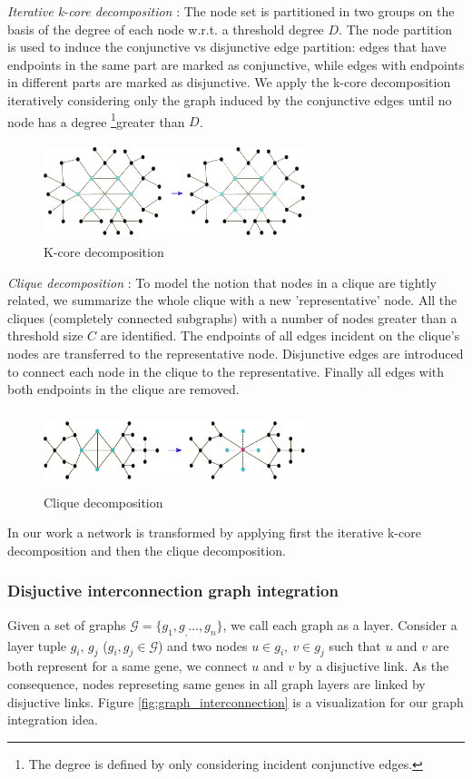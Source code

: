 \textit{Iterative k-core decomposition} \cite{kcore}: The node set is partitioned in two groups on the basis of the degree of each node w.r.t. a threshold degree $D$. The node partition is used to induce the conjunctive vs disjunctive edge partition: edges that have endpoints in the same part are marked as conjunctive, while edges with endpoints in different parts are marked as disjunctive. We apply the k-core decomposition iteratively considering only the graph induced by the conjunctive edges until no node has a degree \footnote{The degree is defined by only considering incident conjunctive edges.}greater than $D$.

\begin{figure}
\includegraphics[height=1.1in, width=3in]{k_core.pdf}
\caption{K-core decomposition}
\label{fig:01}
\end{figure}

\textit{Clique decomposition} \cite{clique}: To model the notion that nodes in a clique are tightly related, we summarize the whole clique with a new 'representative' node. All the cliques (completely connected subgraphs) with a number of nodes greater than a threshold size $C$ are identified. The endpoints of all edges incident on the clique's nodes are transferred to the representative node. Disjunctive edges are introduced to connect each node in the clique to the representative. Finally all edges with both endpoints in the clique are removed.
\begin{figure}
\includegraphics[height=0.9in, width=3in]{cliques.pdf}
\caption{Clique decomposition}
\label{fig:02}
\end{figure}

In our work a network is transformed by applying first the iterative k-core decomposition and then the clique decomposition.

\subsubsection*{Disjuctive interconnection graph integration} 
Given a set of graphs $\mathcal{G} = \lbrace g_1, g_,\ldots, g_n \rbrace$, we call each graph as a layer. Consider a layer tuple $g_i$, $g_j$ ($g_i, g_j \in \mathcal{G}$) and two nodes $u\in g_i,\ v \in g_j$ such that $u$ and $v$ are both represent for a same gene, we connect $u$ and $v$ by a disjuctive link. As the consequence, nodes represeting same genes in all graph layers are linked by disjuctive links. Figure \ref{fig:graph_interconnection} is a visualization for our graph integration idea.

